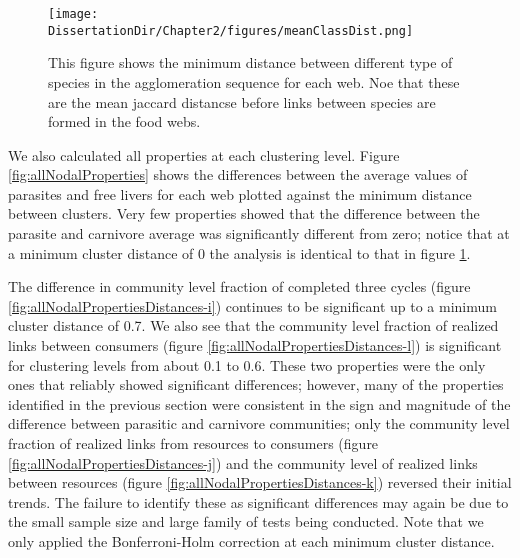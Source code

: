 \documentclass[../dissertation.tex]{subfiles}
\begin{document}
\begin{figure}
    {%
    }%
    \texttt{[image: \\DissertationDir/Chapter2/figures/meanClassDist.png]}

    \caption{This figure shows the minimum distance between different type of
        species in the agglomeration sequence for each web. Noe that these
        are the mean jaccard distancse before links between species are formed
        in the food webs.
    \label{fig:initialNodalProperties}}

\end{figure}

We also calculated all properties at each clustering level. Figure
\ref{fig:allNodalProperties} shows the differences between the average values
of parasites and free livers for each web plotted against the minimum distance
between clusters. Very few properties showed that the difference between the parasite and
carnivore average was significantly different from zero; notice that at a
minimum cluster distance of 0 the analysis is identical to that in
figure \ref{fig:initialNodalProperties}. 

The difference in community level fraction of completed three cycles (figure
\ref{fig:allNodalPropertiesDistances-i}) continues to be significant up to a
minimum cluster distance of 0.7. We also see that the community level fraction
of realized links between consumers (figure
\ref{fig:allNodalPropertiesDistances-l}) is significant for clustering levels
from about 0.1 to 0.6. These two properties were the only ones that reliably
showed significant differences; however, many of the properties identified in
the previous section were consistent in the sign and magnitude of the
difference between parasitic and carnivore communities; only the community
level fraction of realized links from resources to consumers (figure
\ref{fig:allNodalPropertiesDistances-j}) and the community level of realized
links between resources (figure \ref{fig:allNodalPropertiesDistances-k})
reversed their initial trends. The failure to identify these as significant
differences may again be due to the small sample size and large family of tests
being conducted. Note that we only applied the Bonferroni-Holm correction at
each minimum cluster distance.
\end{document}

